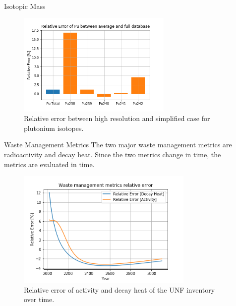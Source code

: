 \documentclass[final]{beamer}
\newlength{\sepwid}
\newlength{\onecolwid}
\newlength{\threecolwid}
\begin{document}
\begin{frame}[t]
\begin{columns}[t,totalwidth=\threecolwid]
\begin{column}{\onecolwid}
\begin{block}{Isotopic Mass}
\begin{figure}
    \centering
    \includegraphics[width=0.7\textwidth]{../images/pu_rel.png}
    \caption{Relative error between high resolution and simplified case for plutonium isotopes.}
    \label{fig:pu_rel}
\end{figure}
\end{block}


\begin{block}{Waste Management Metrics}
The two major waste management metrics are radioactivity and
decay heat. Since the two metrics change in time, the metrics
are evaluated in time.

\begin{figure}
    \centering
    \includegraphics[width=0.8\textwidth]{../images/ha_err.png}
    \caption{Relative error of activity and decay heat of the
            \gls{UNF} inventory over time.}
    \label{fig:wm_err}
\end{figure}


\end{block}

\end{column} %

\begin{column}{\sepwid}\end{column} %



\end{columns}
\end{frame}
\end{document}
